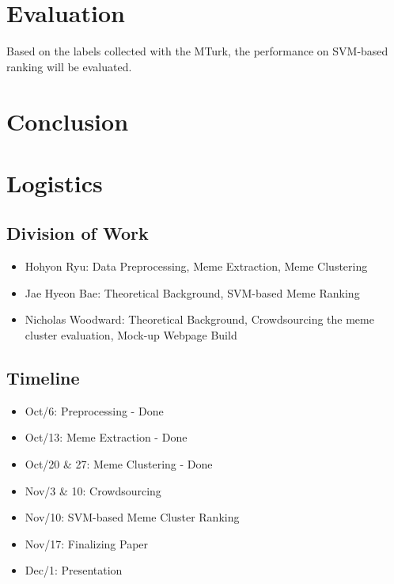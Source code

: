 \documentclass{sig-alternate}
\begin{document}
\section{Evaluation}

Based on the labels collected with the MTurk, the performance on SVM-based ranking will be evaluated.

\section{Conclusion}


\section{Logistics}

\subsection{Division of Work}

\begin{itemize}
\item Hohyon Ryu: Data Preprocessing, Meme Extraction, Meme Clustering
\item Jae Hyeon Bae: Theoretical Background, SVM-based Meme Ranking
\item Nicholas Woodward: Theoretical Background, Crowdsourcing the meme cluster evaluation, Mock-up Webpage Build
\end{itemize}

\subsection{Timeline}


\begin{itemize}
  \item Oct/6: Preprocessing - Done
  \item Oct/13: Meme Extraction - Done
  \item Oct/20 \& 27: Meme Clustering - Done
  \item Nov/3 \& 10: Crowdsourcing 
  \item Nov/10: SVM-based Meme Cluster Ranking
  \item Nov/17: Finalizing Paper
  \item Dec/1: Presentation
\end{itemize}


%

\end{document}
